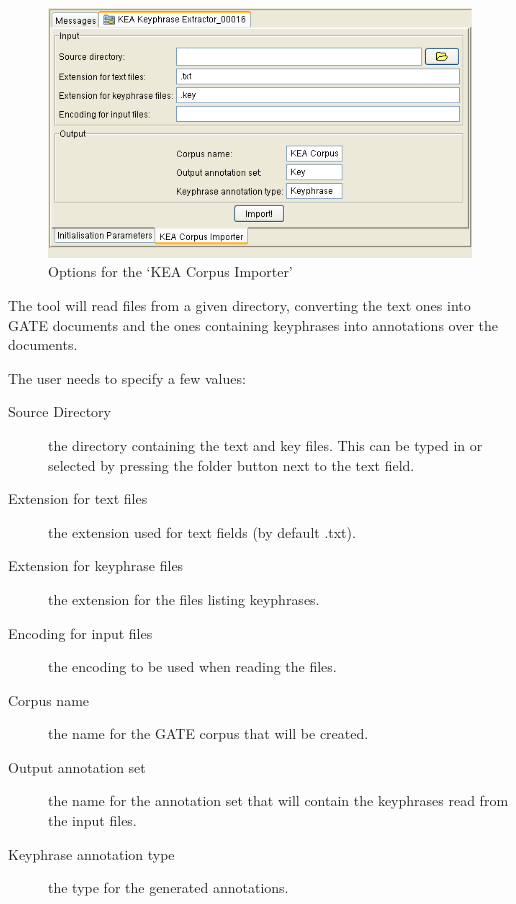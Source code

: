 \begin{figure}
\includegraphics[scale=0.75]{keaCorpusImporter.png}
\caption{Options for the `KEA Corpus Importer'}
\label{fig:keaImporter}
\end{figure}

The tool will read files from a given directory, converting the text ones into
GATE documents and the ones containing keyphrases into annotations over the
documents.

The user needs to specify a few values:
\begin{description}
\item[Source Directory] the directory containing the text and key files. This
can be typed in or selected by pressing the folder button next to the text
field.
\item[Extension for text files] the extension used for text fields (by default
.txt).
\item[Extension for keyphrase files] the extension for the files listing
keyphrases.
\item[Encoding for input files] the encoding to be used when reading the files.
\item[Corpus name] the name for the GATE corpus that will be created.
\item[Output annotation set] the name for the annotation set that will contain
the keyphrases read from the input files.
\item[Keyphrase annotation type] the type for the generated annotations.
\end{description}




